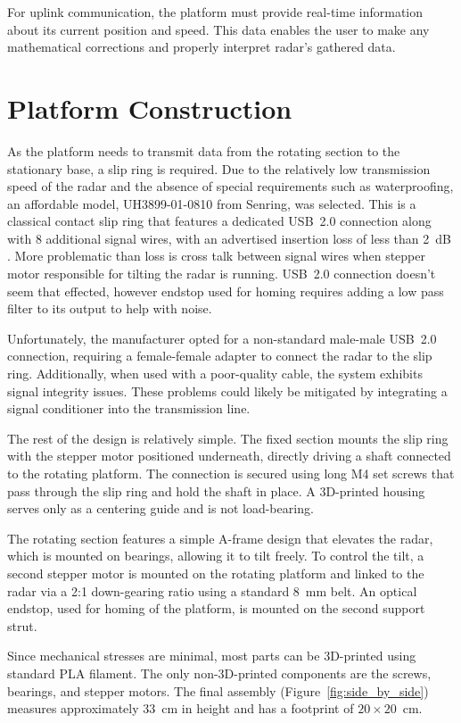 For uplink communication, the platform must provide real-time information about its current position and speed.
This data enables the user to make any mathematical corrections and properly interpret radar's gathered data.


\section{Platform Construction}

As the platform needs to transmit data from the rotating section to the stationary base, a slip ring is required.
Due to the relatively low transmission speed of the radar and the absence of special requirements such as waterproofing, an affordable model, UH3899-01-0810 from Senring, was selected.
This is a classical contact slip ring that features a dedicated USB~2.0 connection along with 8 additional signal wires, with an advertised insertion loss of less than 2~dB \cite{slipring}.
More problematic than loss is cross talk between signal wires when stepper motor responsible for tilting the radar is running.
USB~2.0 connection doesn't seem that effected, however endstop used for homing requires adding a low pass filter to its output to help with noise.

Unfortunately, the manufacturer opted for a non-standard male-male USB~2.0 connection, requiring a female-female adapter to connect the radar to the slip ring.
Additionally, when used with a poor-quality cable, the system exhibits signal integrity issues.
These problems could likely be mitigated by integrating a signal conditioner into the transmission line.

The rest of the design is relatively simple.
The fixed section mounts the slip ring with the stepper motor positioned underneath, directly driving a shaft connected to the rotating platform.
The connection is secured using long M4 set screws that pass through the slip ring and hold the shaft in place.
A 3D-printed housing serves only as a centering guide and is not load-bearing.

The rotating section features a simple A-frame design that elevates the radar, which is mounted on bearings, allowing it to tilt freely.
To control the tilt, a second stepper motor is mounted on the rotating platform and linked to the radar via a 2:1 down-gearing ratio using a standard 8~mm belt.
An optical endstop, used for homing of the platform, is mounted on the second support strut.

Since mechanical stresses are minimal, most parts can be 3D-printed using standard PLA filament.
The only non-3D-printed components are the screws, bearings, and stepper motors.
The final assembly (Figure~\ref{fig:side_by_side}) measures approximately 33~cm in height and has a footprint of $20\times20$~cm.

